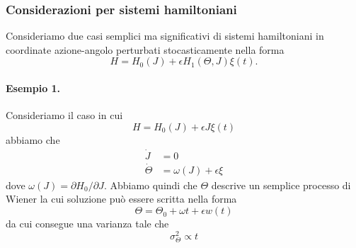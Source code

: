 \documentclass[10pt,a4paper]{article}
\begin{document}
\subsubsection{Considerazioni per sistemi hamiltoniani}
Consideriamo due casi semplici ma significativi di sistemi hamiltoniani in coordinate azione-angolo perturbati stocasticamente nella forma
\begin{equation}
	H = H_0(J) + \epsilon H_1(\Theta, J)\xi(t).
\end{equation}
\paragraph{Esempio 1.}
Consideriamo il caso in cui
\begin{equation}
	H = H_0(J) + \epsilon J \xi(t) 
\end{equation}
abbiamo che
\begin{align}
	\dot{J} &= 0 \\
	\dot{\Theta} &= \omega(J) + \epsilon\xi
\end{align}
dove $\omega(J) = \partial H_0/\partial J$. Abbiamo quindi che $\Theta$ descrive un semplice processo di Wiener la cui soluzione può essere scritta nella forma
\begin{equation}
	\Theta = \Theta_0 + \omega t + \epsilon w(t)
\end{equation}
da cui consegue una varianza tale che
\begin{equation}
	\sigma_{\Theta}^2 \propto t
\end{equation}
\end{document}
